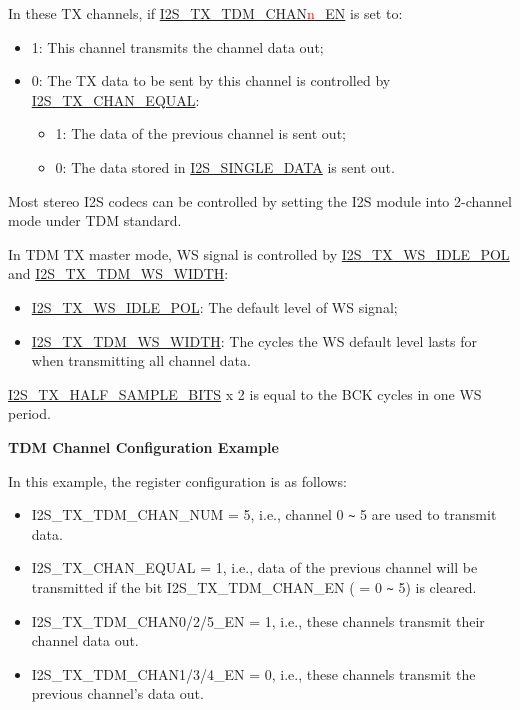 \documentclass[main\_\_EN.tex]{subfiles}
\begin{document}
In these TX channels, if \hyperref[fielddesc:I2STXTDMCHAN0EN]{I2S\_TX\_TDM\_CHAN{\textcolor{red}{n}}\_EN} is set to:

\begin{itemize}
    \item 1: This channel transmits the channel data out;
    \item 0: The TX data to be sent by this channel is controlled by \hyperref[fielddesc:I2STXCHANEQUAL]{I2S\_TX\_CHAN\_EQUAL}:
    \begin{itemize}
        \item 1: The data of the previous channel is sent out;
        \item 0: The data stored in \hyperref[fielddesc:I2SSINGLEDATA]{I2S\_SINGLE\_DATA} is sent out.
    \end{itemize}
\end{itemize}

\vspace{-1em}
\begin{tiplisting}
Most stereo I2S codecs can be controlled by setting the I2S module into 2-channel mode under TDM standard.
\end{tiplisting}

In TDM TX master mode, WS signal is controlled by \hyperref[fielddesc:I2STXWSIDLEPOL]{I2S\_TX\_WS\_IDLE\_POL} and \hyperref[fielddesc:I2STXTDMWSWIDTH]{I2S\_TX\_TDM\_WS\_WIDTH}:
\begin{itemize}
    \item \hyperref[fielddesc:I2STXWSIDLEPOL]{I2S\_TX\_WS\_IDLE\_POL}: The default level of WS signal;
    \item \hyperref[fielddesc:I2STXTDMWSWIDTH]{I2S\_TX\_TDM\_WS\_WIDTH}: The cycles the WS default level lasts for when transmitting all channel data.
\end{itemize}

\hyperref[fielddesc:I2STXHALFSAMPLEBITS]{I2S\_TX\_HALF\_SAMPLE\_BITS} x 2 is equal to the BCK cycles in one WS period.

\textbf{TDM Channel Configuration Example}

In this example, the register configuration is as follows:
\begin{itemize}
    \item I2S\_TX\_TDM\_CHAN\_NUM = 5, i.e., channel 0 \verb+~+ 5 are used to transmit data.
    \item I2S\_TX\_CHAN\_EQUAL = 1, i.e., data of the previous channel will be transmitted if the bit I2S\_TX\_TDM\_CHAN\_EN ( = 0 \verb+~+ 5) is cleared.
    \item I2S\_TX\_TDM\_CHAN0/2/5\_EN = 1, i.e., these channels transmit their channel data out.
    \item I2S\_TX\_TDM\_CHAN1/3/4\_EN = 0, i.e., these channels transmit the previous channel's data out.
\end{itemize}
\end{document}
